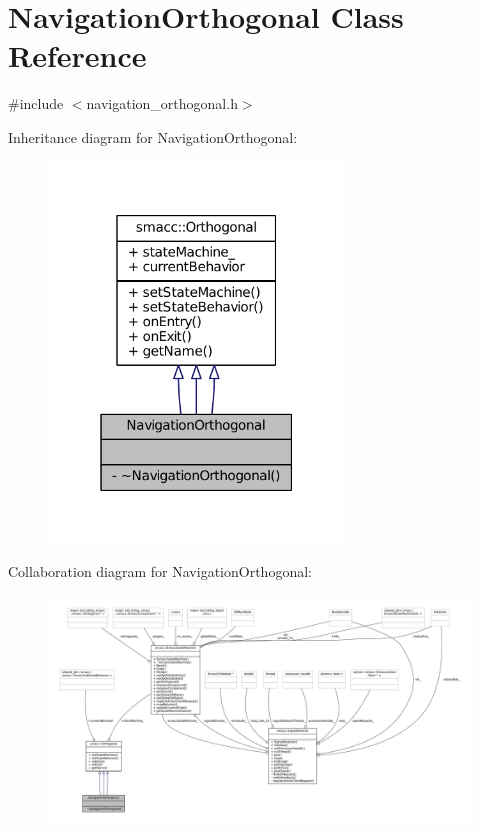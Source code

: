 \hypertarget{classNavigationOrthogonal}{}\section{Navigation\+Orthogonal Class Reference}
\label{classNavigationOrthogonal}


{\ttfamily \#include $<$navigation\+\_\+orthogonal.\+h$>$}



Inheritance diagram for Navigation\+Orthogonal\+:
\nopagebreak
\begin{figure}[H]
\begin{center}
\leavevmode
\includegraphics[width=223pt]{classNavigationOrthogonal__inherit__graph}
\end{center}
\end{figure}


Collaboration diagram for Navigation\+Orthogonal\+:
\nopagebreak
\begin{figure}[H]
\begin{center}
\leavevmode
\includegraphics[width=350pt]{classNavigationOrthogonal__coll__graph}
\end{center}
\end{figure}
